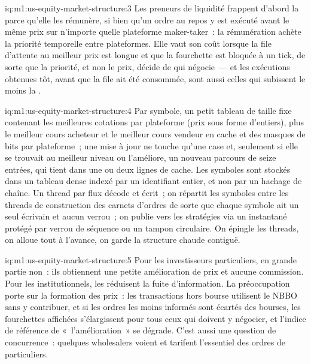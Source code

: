 \begin{solution}{iq:m1:us-equity-market-structure:3}
Les preneurs de liquidité frappent d'abord la  parce qu'elle les rémunère, si bien qu'un ordre au repos
y est exécuté avant le même prix sur n'importe quelle plateforme maker-taker~: la rémunération achète
la priorité temporelle entre plateformes. Elle vaut son coût lorsque la file d'attente au meilleur
prix est longue et que la fourchette est bloquée à un tick, de sorte que la priorité, et non
le prix, décide de qui négocie~--- et les exécutions obtenues tôt, avant que la file ait été
consommée, sont aussi celles qui subissent le moins la .
\end{solution}

\begin{solution}{iq:m1:us-equity-market-structure:4}
Par symbole, un petit tableau de taille fixe contenant les meilleures cotations par plateforme (prix sous forme
d'entiers), plus le meilleur cours acheteur et le meilleur cours vendeur en cache et des masques de bits par plateforme~; une mise à jour
ne touche qu'une case et, seulement si elle se trouvait au meilleur niveau ou l'améliore, un nouveau parcours de
seize entrées, qui tient dans une ou deux lignes de cache. Les symboles sont stockés dans un tableau dense
indexé par un identifiant entier, et non par un hachage de chaîne. Un thread par flux
décode et écrit~; on répartit les symboles entre les threads de construction des carnets d'ordres de sorte que chaque
symbole ait un seul écrivain et aucun verrou~; on publie vers les stratégies via un
instantané protégé par verrou de séquence ou un tampon circulaire. On épingle les threads, on alloue tout à l'avance,
on garde la structure chaude contiguë.
\end{solution}

\begin{solution}{iq:m1:us-equity-market-structure:5}
Pour les investisseurs particuliers, en grande partie non~: ils obtiennent une petite amélioration de prix et aucune
commission. Pour les institutionnels, les  réduisent la fuite d'information. La
préoccupation porte sur la formation des prix~: les transactions hors bourse utilisent le NBBO sans
y contribuer, et si les ordres les moins informés sont écartés des bourses,
les fourchettes affichées s'élargissent pour tous ceux qui doivent y négocier, et
l'indice de référence de «~l'amélioration~» se dégrade. C'est aussi une question de concurrence~:
quelques wholesalers voient et tarifent l'essentiel des ordres de particuliers.
\end{solution}

